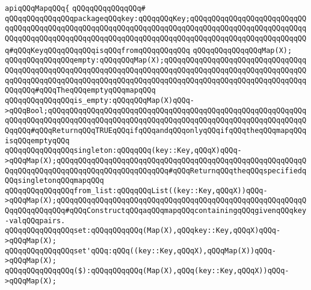 \newline
\newline
\newline
\newline
\newline
\verb|apiqQQqMapqQQq{|\newline
\verb|qQQqqQQqqQQqqQQq#|\newline
\verb|qQQqqQQqqQQqqQQqpackageqQQqkey:qQQqqQQqKey;qQQqqQQqqQQqqQQqqQQqqQQqqQQqqQQqqQQqqQQqqQQqqQQqqQQqqQQqqQQqqQQqqQQqqQQqqQQqqQQqqQQqqQQqqQQqqQQqqQQqqQQqqQQqqQQqqQQqqQQqqQQqqQQqqQQqqQQqqQQqqQQqqQQqqQQqqQQqqQQqqQQqqQQq#qQQqKeyqQQqqQQqqQQqisqQQqfromqQQqqQQqqQQq|\newline
\newline
\verb|qQQqqQQqqQQqqQQqMap(X);|\newline
\newline
\verb|qQQqqQQqqQQqqQQqempty:qQQqqQQqMap(X);qQQqqQQqqQQqqQQqqQQqqQQqqQQqqQQqqQQqqQQqqQQqqQQqqQQqqQQqqQQqqQQqqQQqqQQqqQQqqQQqqQQqqQQqqQQqqQQqqQQqqQQqqQQqqQQqqQQqqQQqqQQqqQQqqQQqqQQqqQQqqQQqqQQqqQQqqQQqqQQqqQQqqQQqqQQqqQQqqQQq#qQQqTheqQQqemptyqQQqmapqQQq|\newline
\newline
\verb|qQQqqQQqqQQqqQQqis_empty:qQQqqQQqMap(X)qQQq->qQQqBool;qQQqqQQqqQQqqQQqqQQqqQQqqQQqqQQqqQQqqQQqqQQqqQQqqQQqqQQqqQQqqQQqqQQqqQQqqQQqqQQqqQQqqQQqqQQqqQQqqQQqqQQqqQQqqQQqqQQqqQQqqQQqqQQqqQQqqQQq#qQQqReturnqQQqTRUEqQQqifqQQqandqQQqonlyqQQqifqQQqtheqQQqmapqQQqisqQQqemptyqQQq|\newline
\newline
\verb|qQQqqQQqqQQqqQQqsingleton:qQQqqQQq(key::Key,qQQqX)qQQq->qQQqMap(X);qQQqqQQqqQQqqQQqqQQqqQQqqQQqqQQqqQQqqQQqqQQqqQQqqQQqqQQqqQQqqQQqqQQqqQQqqQQqqQQqqQQqqQQqqQQqqQQq#qQQqReturnqQQqtheqQQqspecifiedqQQqsingletonqQQqmapqQQq|\newline
\newline
\verb|qQQqqQQqqQQqqQQqfrom_list:qQQqqQQqList((key::Key,qQQqX))qQQq->qQQqMap(X);qQQqqQQqqQQqqQQqqQQqqQQqqQQqqQQqqQQqqQQqqQQqqQQqqQQqqQQqqQQqqQQqqQQqqQQq#qQQqConstructqQQqaqQQqmapqQQqcontainingqQQqgivenqQQqkey-valqQQqpairs.|\newline
\newline
\verb|qQQqqQQqqQQqqQQqset:qQQqqQQqqQQq(Map(X),qQQqkey::Key,qQQqX)qQQq->qQQqMap(X);|\newline
\verb|qQQqqQQqqQQqqQQqset'qQQq:qQQq((key::Key,qQQqX),qQQqMap(X))qQQq->qQQqMap(X);|\newline
\verb|qQQqqQQqqQQqqQQq($):qQQqqQQqqQQq(Map(X),qQQq(key::Key,qQQqX))qQQq->qQQqMap(X);|\newline
